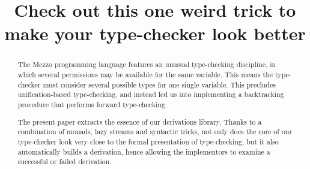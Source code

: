 \documentclass[nonatbib]{sigplanconf}
\begin{document}
\setlength{\pdfpageheight}{\paperheight}
\setlength{\pdfpagewidth}{\paperwidth}

\exclusivelicense


\title{Check out this one weird trick to make your type-checker look better}


\maketitle

\begin{abstract}
  The Mezzo programming language features an unusual type-checking discipline,
  in which several permissions may be available for the same variable. This
  means the type-checker must consider several possible types for one
  single variable. This precludes unification-based type-checking, and instead
  led us into implementing a backtracking procedure that performs forward
  type-checking.

  The present paper extracts the essence of our derivations library. Thanks to a
  combination of monads, lazy streams and syntactic tricks, not only does the
  core of our type-checker look very close to the formal presentation of
  type-checking, but it also automatically builds a derivation, hence allowing
  the implementors to examine a successful or failed derivation.
\end{abstract}








\end{document}
